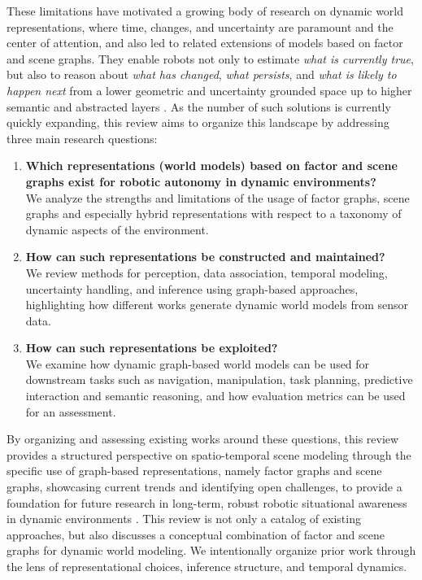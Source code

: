 These limitations have motivated a growing body of research on dynamic world representations, where time, changes, and uncertainty are paramount and the center of attention, and also led to  related extensions of models based on factor and scene graphs. They enable robots not only to estimate \textit{what is currently true}, but also to reason about \textit{what has changed}, \textit{what persists}, and \textit{what is likely to happen next} from a lower geometric and uncertainty grounded space up to higher semantic and abstracted layers\cite{schmid_khronos_2024} \cite{morris_dynosam_2025}. As the number of such solutions is currently quickly expanding, this review aims to organize this landscape by addressing three main research questions:
\begin{enumerate}
    \item \textbf{Which representations (world models) based on factor and scene graphs  exist for robotic autonomy in dynamic environments?} \\
    We analyze the strengths and limitations of the usage of factor graphs, scene graphs and especially hybrid representations with respect to a taxonomy of dynamic aspects of the environment.
    \item \textbf{How can such representations be constructed and maintained?}\\
    We review methods for perception, data association, temporal modeling, uncertainty handling, and inference using graph-based approaches, highlighting how different works generate dynamic world models from sensor data.
    \item \textbf{How can such representations be exploited?}\\
    We examine how dynamic graph-based world models can be used for downstream tasks such as navigation, manipulation, task planning, predictive interaction and semantic reasoning, and how evaluation metrics can be used for an assessment. 
\end{enumerate}
By organizing and assessing existing works around these questions, this review provides a  structured perspective on spatio-temporal scene modeling through the specific use of graph-based representations, namely factor graphs and scene graphs, showcasing current trends and identifying open challenges, to provide a foundation for future research in long-term, robust robotic situational awareness in dynamic environments \cite{bavle_slam_2023}. 
This review is not only a catalog of existing approaches, but also discusses a conceptual combination of factor and scene graphs for dynamic world modeling. We intentionally organize prior work through the lens of representational choices, inference structure, and temporal dynamics.

